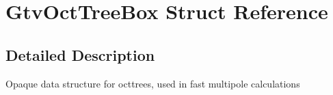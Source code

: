 \section{Gtv\+Oct\+Tree\+Box Struct Reference}
\label{structGtvOctTreeBox}


\subsection{Detailed Description}
Opaque data structure for octtrees, used in fast multipole calculations 
